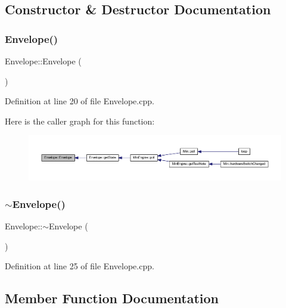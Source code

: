 \subsection{Constructor \& Destructor Documentation}
\mbox{\label{class_envelope_ac609dfa5fe79dd719530e8c29bb35725}} 
\subsubsection{\texorpdfstring{Envelope()}{Envelope()}}
{\footnotesize\ttfamily Envelope\+::\+Envelope (\begin{DoxyParamCaption}{ }\end{DoxyParamCaption})}



Definition at line 20 of file Envelope.\+cpp.

Here is the caller graph for this function\+:
\nopagebreak
\begin{figure}[H]
\begin{center}
\leavevmode
\includegraphics[width=350pt]{class_envelope_ac609dfa5fe79dd719530e8c29bb35725_icgraph}
\end{center}
\end{figure}
\mbox{\label{class_envelope_a0d854766d1fc084d27ddb7b6cf7967af}} 
\subsubsection{\texorpdfstring{$\sim$\+Envelope()}{~Envelope()}}
{\footnotesize\ttfamily Envelope\+::$\sim$\+Envelope (\begin{DoxyParamCaption}{ }\end{DoxyParamCaption})}



Definition at line 25 of file Envelope.\+cpp.



\subsection{Member Function Documentation}
\mbox{\label{class_envelope_ac1cf99747551ea56b1202844da4fddde}} 
